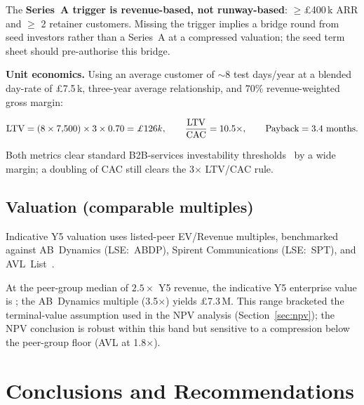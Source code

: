 \noindent The \textbf{Series~A trigger is revenue-based, not
runway-based}: $\geq$\pounds400\,k ARR and $\geq$ 2 retainer
customers. Missing the trigger implies a bridge round from seed
investors rather than a Series~A at a compressed valuation; the
seed term sheet should pre-authorise this bridge.

\medskip

\noindent \textbf{Unit economics.} Using an average customer of
$\sim$8 test days/year at a blended day-rate of \pounds7.5\,k,
three-year average relationship, and 70\% revenue-weighted gross
margin:

\begin{equation}
\mathrm{LTV} = (8 \times 7{,}500) \times 3 \times 0.70 = \ltv,
\qquad
\frac{\mathrm{LTV}}{\mathrm{CAC}} = \ltvCac,
\qquad
\mathrm{Payback} = \paybackMonths \text{ months}.
\end{equation}

Both metrics clear standard B2B-services investability
thresholds~\cite{gompers2020} by a wide margin; a doubling of CAC
still clears the 3$\times$ LTV/CAC rule.

\subsection{Valuation (comparable multiples)}
\label{sec:valuation}

Indicative Y5 valuation uses listed-peer EV/Revenue multiples,
benchmarked against AB~Dynamics (LSE:~ABDP), Spirent Communications
(LSE:~SPT), and AVL~List~\cite{abdynamics_ar2024,avl_profile}.



At the peer-group median of $2.5\times$ Y5 revenue, the indicative
Y5 enterprise value is \terminalValue; the AB~Dynamics multiple
(3.5$\times$) yields \pounds7.3\,M. This range bracketed the
terminal-value assumption used in the NPV analysis
(Section~\ref{sec:npv}); the NPV conclusion is robust within this
band but sensitive to a compression below the peer-group floor
(AVL at 1.8$\times$).

\section{Conclusions and Recommendations}
\label{ch:concl}

